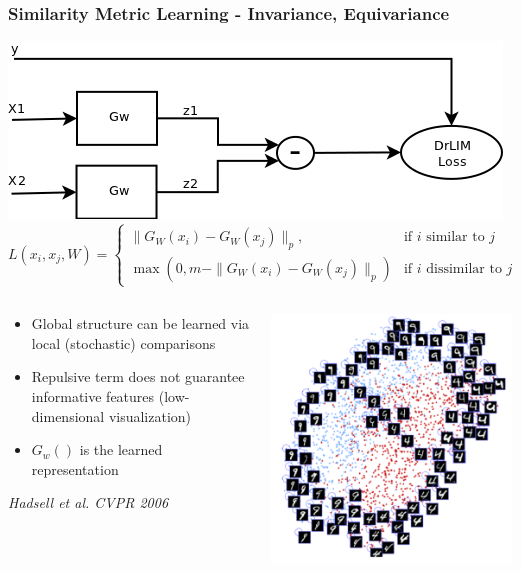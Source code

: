 \documentclass{beamer}
\begin{document}
\begin{frame} 
\frametitle{Similarity Metric Learning - Invariance, Equivariance}
\centering
\includegraphics[scale=0.4]{./Figures/drlim_diag.png}
\begin{equation} 
\nonumber
L(x_i,x_j,W)=\left\{
                \begin{array}{ll}
                 \|G_W(x_i) - G_W(x_{j})\|_p, &\text{if $i$ similar to $j$}  \\
                 \max(0,m-\|G_W(x_i) - G_W(x_{j})\|_p) &\text{if $i$ dissimilar to $j$}
                \end{array}
              \right.
\end{equation} 
\begin{columns}[T] %
\begin{column}{.6\textwidth}
\begin{itemize} 
\item{Global structure can be learned via local (stochastic) comparisons}
\item{Repulsive term does not guarantee informative features (low-dimensional visualization)} 
\item{$G_w()$ is the learned representation}   
\end{itemize} 
\emph{\tiny{Hadsell et al. CVPR 2006}}
\end{column}%
\begin{column}{.4\textwidth}
\includegraphics[scale=0.2]{./Figures/mnist.png}

\end{column}
\end{columns}
\end{frame}
\end{document}
